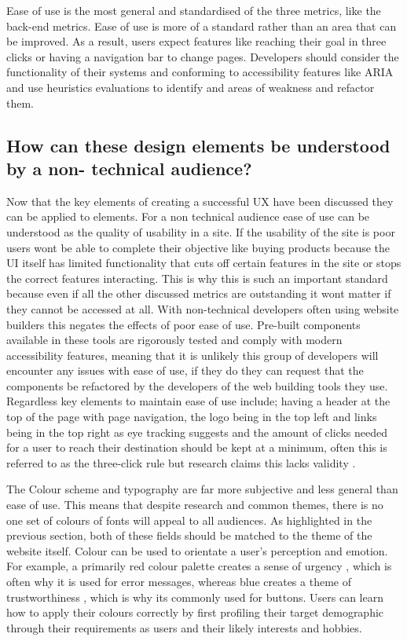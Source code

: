 \documentclass[article]{IEEEtran}
\begin{document}
            Ease of use is the most general and standardised of the three metrics, like the back-end metrics. Ease of use is more of a standard rather than an area that can be improved. As a result, users expect features like reaching their goal in three clicks or having a navigation bar to change pages. Developers should consider the functionality of their systems and conforming to accessibility features like ARIA and use heuristics evaluations to identify and areas of weakness and refactor them.

        \subsection{How can these design elements be understood by a non-
technical audience?}
            Now that the key elements of creating a successful UX have been discussed they can be applied to elements. For a non technical audience ease of use can be understood as the quality of usability in a site. If the usability of the site is poor users wont be able to complete their objective like buying products because the UI itself has limited functionality that cuts off certain features in the site or stops the correct features interacting. This is why this is such an important standard because even if all the other discussed metrics are outstanding it wont matter if they cannot be accessed at all. With non-technical developers often using website builders this negates the effects of poor ease of use. Pre-built components available in these tools are rigorously tested and comply with modern accessibility features, meaning that it is unlikely this group of developers will encounter any issues with ease of use, if they do they can request that the components be refactored by the developers of the web building tools they use. Regardless key elements to maintain ease of use include; having a header at the top of the page with page navigation, the logo being in the top left and links being in the top right as eye tracking suggests \cite{nevarez} and the amount of clicks needed for a user to reach their destination should be kept at a minimum, often this is referred to as the three-click rule but research claims this lacks validity \cite{porter, iglesias}.

            The Colour scheme and typography are far more subjective and less general than ease of use. This means that despite research and common themes, there is no one set of colours of fonts will appeal to all audiences. As highlighted in the previous section, both of these fields should be matched to the theme of the website itself. Colour can be used to orientate a user's perception and emotion. For example, a primarily red colour palette creates a sense of urgency \cite{lanyi}, which is often why it is used for error messages, whereas blue creates a theme of trustworthiness \cite{lanyi}, which is why its commonly used for buttons. Users can learn how to apply their colours correctly by first profiling their target demographic through their requirements as users and their likely interests and hobbies. 
            
\end{document}
